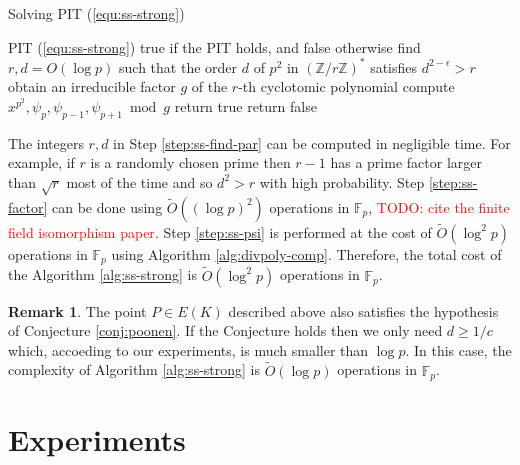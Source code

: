 \documentclass[12pt]{article}
\theoremstyle{plain}
\theoremstyle{definition}
\newtheorem*{remark}{Remark}
\newcommand{\tildO}{\tilde{O}}
\newcommand{\todo}[1]{\textcolor{red}{TODO: #1}}
\def\Z{\ensuremath{\mathbb{Z}}}
\def\F{\ensuremath{\mathbb{F}}}
\begin{document}
\begin{algorithm}[H]
	\caption{Solving PIT (\ref{equ:ss-strong})}
	\label{alg:ss-strong}
	\begin{algorithmic}[1]
		\REQUIRE PIT (\ref{equ:ss-strong})
		\ENSURE true if the PIT holds, and false otherwise
		\STATE\label{step:ss-find-par}
		find $r, d = O(\log p)$ such that the order $d$ of $p^2$ in $(\Z/r\Z)^*$ satisfies $d^{2 - 
		\epsilon} > r$
		\STATE\label{step:ss-factor}
		obtain an irreducible factor $g$ of the $r$-th cyclotomic polynomial
		\STATE\label{step:ss-psi}
		compute $x^{p^2}, \psi_p, \psi_{p - 1}, \psi_{p + 1} \bmod g$
			\STATE return true
		\ELSE
			\STATE return false
		\ENDIF
	\end{algorithmic}
\end{algorithm}

The integers $r, d$ in Step \ref{step:ss-find-par} can be computed in negligible time. For example, 
if $r$ is a randomly chosen prime then $r - 1$ has a prime factor larger than $\sqrt{r}$ most of 
the time and so $d^2 > r$ with high probability. Step \ref{step:ss-factor} can be done using 
$\tildO((\log p)^2)$ operations in $\F_p$, \todo{cite the finite field isomorphism paper}. Step 
\ref{step:ss-psi} is performed at the cost of $\tildO(\log^2 p)$ operations in $\F_p$ using 
Algorithm \ref{alg:divpoly-comp}. Therefore, the total cost of the Algorithm \ref{alg:ss-strong} is 
$\tildO(\log^2 p)$ operations in $\F_p$.

\begin{remark}
	The point $P \in E(K)$ described above also satisfies the hypothesis of Conjecture 
	\ref{conj:poonen}. If the Conjecture holds then we only need $d \ge 1 / c$ which, accoeding to 
	our experiments, is much smaller than $\log p$. In this case, the complexity of Algorithm 
	\ref{alg:ss-strong} is $\tildO(\log p)$ operations in $\F_p$.
\end{remark}




\section{Experiments}









\end{document}
